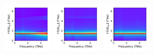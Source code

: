 \documentclass[a4paper]{article}
\begin{document}
\begin{figure}[H]
  \centering
  \includegraphics[width=0.23\textwidth]{cond_w_pcolor-A1-v0-imp0.pdf}
  \includegraphics[width=0.23\textwidth]{cond_w_pcolor-A1-v1-imp0.pdf}
  \includegraphics[width=0.23\textwidth]{cond_w_pcolor-A1-v2-imp0.pdf}
\end{figure}


\newpage
\end{document}
